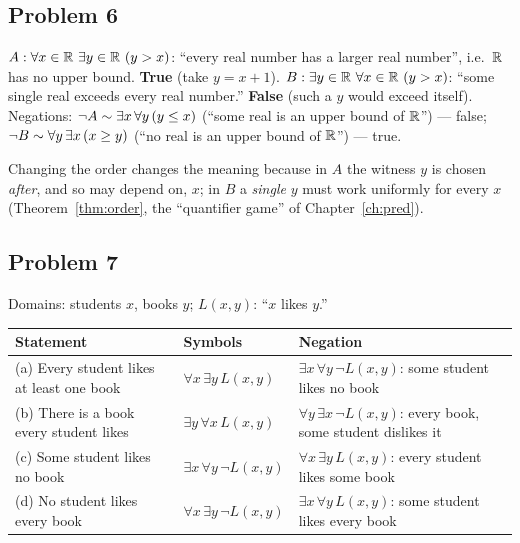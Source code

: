 \subsection*{Problem 6}
$A:\forall x\in\R\ \exists y\in\R\ (y>x)$: ``every real number has a larger real number'', i.e.\ $\mathbb{R}$ has no upper bound. \textbf{True} (take $y=x+1$). $B:\exists y\in\R\ \forall x\in\R\ (y>x)$: ``some single real exceeds every real number.'' \textbf{False} (such a $y$ would exceed itself). Negations: $\neg A\sim\exists x\,\forall y\,(y\le x)$ (``some real is an upper bound of $\mathbb{R}$'') — false; $\neg B\sim\forall y\,\exists x\,(x\ge y)$ (``no real is an upper bound of $\mathbb{R}$'') — true.

Changing the order changes the meaning because in $A$ the witness $y$ is chosen \emph{after}, and so may depend on, $x$; in $B$ a \emph{single} $y$ must work uniformly for every $x$ (Theorem~\ref{thm:order}, the ``quantifier game'' of Chapter~\ref{ch:pred}).

\subsection*{Problem 7}
Domains: students $x$, books $y$; $L(x,y)$: ``$x$ likes $y$.''
\begin{center}
	\begin{tabular}{@{}p{5.4cm}p{4.4cm}p{4.6cm}@{}}
		\toprule
		\textbf{Statement} & \textbf{Symbols} & \textbf{Negation}\\
		\midrule
		(a) Every student likes at least one book & $\forall x\,\exists y\,L(x,y)$ & $\exists x\,\forall y\,\neg L(x,y)$: some student likes no book\\
		(b) There is a book every student likes & $\exists y\,\forall x\,L(x,y)$ & $\forall y\,\exists x\,\neg L(x,y)$: every book, some student dislikes it\\
		(c) Some student likes no book & $\exists x\,\forall y\,\neg L(x,y)$ & $\forall x\,\exists y\,L(x,y)$: every student likes some book\\
		(d) No student likes every book & $\forall x\,\exists y\,\neg L(x,y)$ & $\exists x\,\forall y\,L(x,y)$: some student likes every book\\
		\bottomrule
	\end{tabular}
\end{center}

